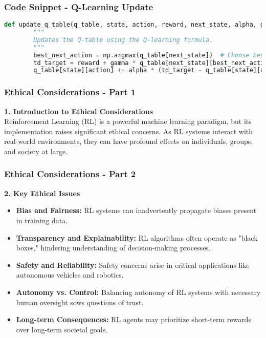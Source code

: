 \documentclass[aspectratio=169]{beamer}
\begin{document}
\begin{frame}[fragile]
    \frametitle{Code Snippet - Q-Learning Update}
    \begin{lstlisting}[language=Python]
    def update_q_table(q_table, state, action, reward, next_state, alpha, gamma):
        """
        Updates the Q-table using the Q-learning formula.
        """
        best_next_action = np.argmax(q_table[next_state])  # Choose best action for next state
        td_target = reward + gamma * q_table[next_state][best_next_action]  # Compute target
        q_table[state][action] += alpha * (td_target - q_table[state][action])  # Update Q-value
    \end{lstlisting}
\end{frame}

\begin{frame}[fragile]
    \frametitle{Ethical Considerations - Part 1}
    \textbf{1. Introduction to Ethical Considerations} \\
    Reinforcement Learning (RL) is a powerful machine learning paradigm, but its implementation raises significant ethical concerns. As RL systems interact with real-world environments, they can have profound effects on individuals, groups, and society at large.
\end{frame}

\begin{frame}[fragile]
    \frametitle{Ethical Considerations - Part 2}
    \textbf{2. Key Ethical Issues}

    \begin{itemize}
        \item \textbf{Bias and Fairness:} RL systems can inadvertently propagate biases present in training data.
        \item \textbf{Transparency and Explainability:} RL algorithms often operate as "black boxes," hindering understanding of decision-making processes.
        \item \textbf{Safety and Reliability:} Safety concerns arise in critical applications like autonomous vehicles and robotics.
        \item \textbf{Autonomy vs. Control:} Balancing autonomy of RL systems with necessary human oversight sows questions of trust.
        \item \textbf{Long-term Consequences:} RL agents may prioritize short-term rewards over long-term societal goals.
    \end{itemize}
\end{frame}
\end{document}
